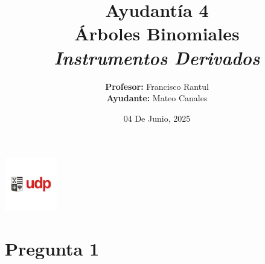 \documentclass{beamer}
\title{Ayudantía 4 \\  Árboles Binomiales
\\ \large\textit{Instrumentos Derivados}}
\author{
  \texorpdfstring{
    \textbf{Profesor:} Francisco Rantul \\[0.3em]
    \textbf{Ayudante:} Mateo Canales
  }{Profesor: Francisco Rantul, Ayudante: Mateo Canales}
}
\institute{Universidad Diego Portales}
\date{04 De Junio, 2025}
\begin{document}
\begin{frame}
    \titlepage
    \vfill
    \centering
    \includegraphics[width=2.3118cm]{../imagenes/logo.png}
  \end{frame}

\newcommand{\cajaverde}[1]{%
  \fcolorbox{blue}{green!20}{%
    { #1}%
  }
}
\newcommand{\cajaverdeletra}[1]{%
  \fcolorbox{blue}{green!20}{%
    \parbox{0.9\linewidth}{\justifying #1}%
  }
}
\newcommand{\formula}[1]{\textcolor{blue}{#1}}
\newcommand{\entero}[1]{\pgfmathprintnumber[fixed, precision=0]{#1}}
\newcommand{\decimal}[1]{\pgfmathprintnumber[fixed, precision=2]{#1}}
\newcommand{\decimalx}[1]{\pgfmathprintnumber[fixed, precision=3]{#1}}
\newcommand{\decimalxx}[1]{\pgfmathprintnumber[fixed, precision=4]{#1}}
\newcommand{\porcentaje}[1]{%
  \pgfmathsetmacro{\temp}{#1*100}%
  \pgfmathprintnumber[fixed, precision=2]{\temp}\%%
  }
\newcommand{\dinero}[1]{%
  \$\,\pgfmathprintnumber[fixed, precision=0]{#1}
  }
\newcommand{\dineros}[1]{%
  \$\,\pgfmathprintnumber[fixed, precision=1]{#1}
  }
\newcommand{\dineross}[1]{%
  \$\,\pgfmathprintnumber[fixed, precision=2]{#1}
  }
\newcommand{\Desarrollo}[1]{Desarrollo Parte {#1})}





\section{Pregunta 1}

\newcommand{\Suno}{50}
\newcommand{\Kuno}{50}
\newcommand{\rdiez}{0.10}
\newcommand{\sigmaPuno}{0.30}
\newcommand{\Tuno}{0.25}
\newcommand{\Divuno}{1.5}
\newcommand{\Tdos}{\frac{2}{12}} %

\newcommand{\callbsm}{$c =  S_0 \cdot N(d_1)- K \cdot e^{-r \cdot (T)} \cdot N(d_2) $}
\newcommand{\putbsm}{$p = K \cdot e^{-r \cdot (T)} \cdot N(-d_2) - S_0 \cdot N(-d_1)$}
\newcommand{\Duno }{$  d_1 = \frac{\ln(S_0 / K) + \left( r + \frac{\sigma^2}{2} \right) \cdot T}{\sigma \cdot \sqrt{T}}$}
\newcommand{\Ddos}{$d_2 = d_1 - \sigma \cdot \sqrt{T}$}
\newcommand{\dividendo}{$S_1 = S_0 - e^{-r \cdot t} \cdot div $}
\newcommand{\vp}{$vp =e^{-r \cdot t} \cdot valor futuro $}
\end{document}

